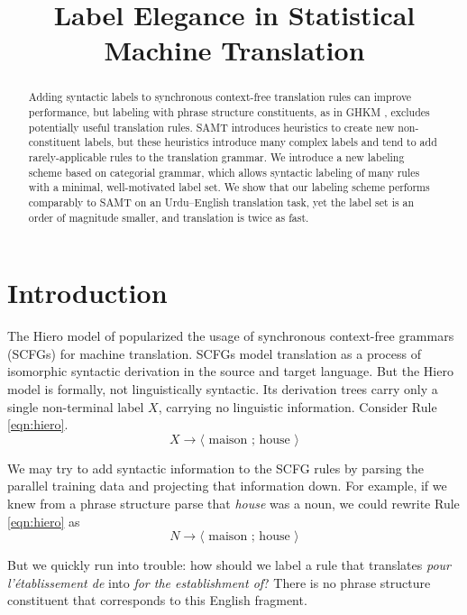 \documentclass[a4paper]{article}
\author{
\anonymize{
Jonathan Weese \and Chris Callison-Burch \and Adam Lopez\\
Department of Computer Science\\
Human Language Technology Center of Excellence\\ %
Johns Hopkins University\\
Baltimore, MD 21218 USA\\
{\tt \{jonny,ccb,alopez\}@cs.jhu.edu}}
}
\title{Label Elegance in Statistical Machine Translation}
\begin{document}
\maketitle

\begin{abstract}
Adding syntactic labels to synchronous context-free translation rules can improve performance, but labeling with phrase structure constituents, as in GHKM \cite{ghkm}, excludes potentially useful translation rules. SAMT \cite{samt-wmt06} introduces heuristics to create new non-constituent labels, but these heuristics introduce many complex labels and tend to add rarely-applicable rules to the translation grammar. We introduce a new labeling scheme based on categorial grammar, which allows syntactic labeling of many rules with a minimal, well-motivated label set. We show that our labeling scheme performs comparably to SAMT on an Urdu--English translation task, yet the label set is an order of magnitude smaller, and translation is twice as fast.
\end{abstract}

\section{Introduction}

The Hiero model of  popularized the usage of synchronous context-free grammars (SCFGs) for machine translation. SCFGs model translation as a process of isomorphic syntactic derivation in the source and target language. But the Hiero model is formally, not linguistically syntactic. Its derivation trees carry only a single non-terminal label $X$, carrying no linguistic information. Consider Rule \ref{eqn:hiero}.
\begin{equation}
X \to \langle \textrm{ maison ; house } \rangle\label{eqn:hiero}
\end{equation}

We may try to add syntactic information to the SCFG rules by parsing the parallel training data and projecting that information down. For example, if we knew from a phrase structure parse that {\em house} was a noun, we could rewrite Rule \ref{eqn:hiero} as
\begin{equation*}
N \to \langle \textrm{ maison ; house } \rangle
\end{equation*}

But we quickly run into trouble: how should we label a rule that translates {\em pour l'\'{e}tablissement de} into {\em for the establishment of}? There is no phrase structure constituent that corresponds to this English fragment.
\end{document}
